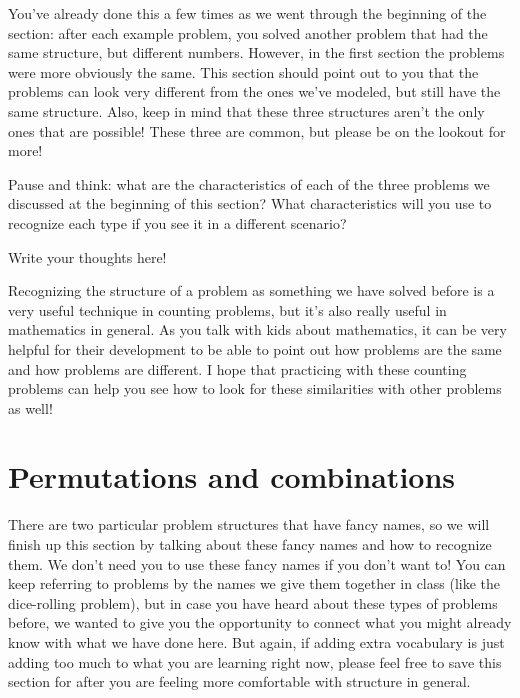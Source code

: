 \documentclass{ximera}
\begin{document}
You've already done this a few times as we went through the beginning of the section: after each example problem, you solved another problem that had the same structure, but different numbers. However, in the first section the problems were more obviously the same. This section should point out to you that the problems can look very different from the ones we've modeled, but still have the same structure. Also, keep in mind that these three structures aren't the only ones that are possible! These three are common, but please be on the lookout for more!

\begin{question}
Pause and think: what are the characteristics of each of the three problems we discussed at the beginning of this section? What characteristics will you use to recognize each type if you see it in a different scenario?
\begin{freeResponse}
Write your thoughts here!
\end{freeResponse}
\end{question}

Recognizing the structure of a problem as something we have solved before is a very useful technique in counting problems, but it's also really useful in mathematics in general. As you talk with kids about mathematics, it can be very helpful for their development to be able to point out how problems are the same and how problems are different. I hope that practicing with these counting problems can help you see how to look for these similarities with other problems as well!


\section{Permutations and combinations}

There are two particular problem structures that have fancy names, so we will finish up this section by talking about these fancy names and how to recognize them. We don't need you to use these fancy names if you don't want to! You can keep referring to problems by the names we give them together in class (like the dice-rolling problem), but in case you have heard about these types of problems before, we wanted to give you the opportunity to connect what you might already know with what we have done here. But again, if adding extra vocabulary is just adding too much to what you are learning right now, please feel free to save this section for after you are feeling more comfortable with structure in general.
\end{document}

